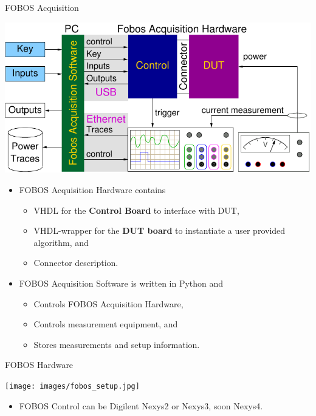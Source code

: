 \documentclass[xcolor=pdftex,dvipsnames,table,final]{beamer}
\begin{document}
\begin{frame}[fragile]{}
\begin{columns}[t]
\begin{column}{.31\linewidth}
      \begin{block}{FOBOS Acquisition}
        \begin{center}
          \includegraphics[scale=1.7]{../figures/fobos-dac}
        \end{center} 

          \begin{itemize}
            \item FOBOS Acquisition Hardware contains 
            \begin{itemize}
              \item VHDL for the \textbf{Control Board} to interface with DUT,
              \item VHDL-wrapper for the \textbf{DUT board} to instantiate a user provided algorithm, and
              \item Connector description.
            \end{itemize}
            \item FOBOS Acquisition Software is written in Python and 
            \begin{itemize}
              \item Controls FOBOS Acquisition Hardware,
              \item Controls measurement equipment, and
              \item Stores measurements and setup information.
            \end{itemize}
          \end{itemize}
       \end{block}
     
      \begin{block}{FOBOS Hardware}
        \vspace{-1ex}
        \begin{center}
          \texttt{[image: images/fobos\_setup.jpg]}
        \end{center} 
        \begin{itemize}
          \item FOBOS Control can be Digilent Nexys2 or Nexys3, soon Nexys4.
        \end{itemize}
        \vspace{-0.2ex}
       \end{block}
     

\end{column}
\end{columns}
\end{frame}
\end{document}

